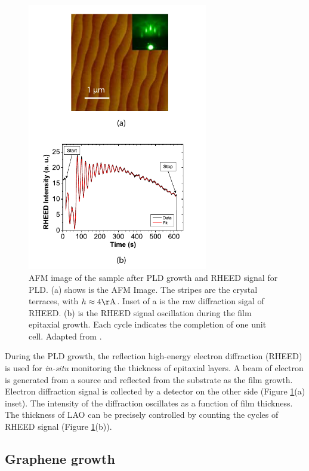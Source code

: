 \documentclass[pdflatex, sectionletters, 12pt]{pittetd}    %
\begin{document}
\begin{figure}[hp!]
	\centering
	\includegraphics[width=0.7\textwidth]{Drawing/PLD_RHEED.pdf}
	\caption{AFM image of the sample after PLD growth and RHEED signal for PLD. (a) shows is the AFM Image. The stripes are the crystal terraces, with $h \approx 4 \mathrm{\AA}$. Inset of a is the raw diffraction sigal of RHEED. (b) is the RHEED signal oscillation during the film epitaxial growth. Each cycle indicates the completion of one unit cell. Adapted from \cite{podkaminer2016real}.}
	\label{FIG:RHEED}
\end{figure}

During the PLD growth, the reflection high-energy electron diffraction (RHEED) is used for \emph{in-situ} monitoring the thickness of epitaxial layers. A beam of electron is generated from a source and reflected from the substrate as the film growth. Electron diffraction signal is collected by a detector on the other side (Figure \ref{FIG:RHEED}(a) inset). The intensity of the diffraction oscillates as a function of film thickness. The thickness of LAO can be precisely controlled by counting the cycles of RHEED signal (Figure \ref{FIG:RHEED}(b)).

\subsection{Graphene growth}
\end{document}
